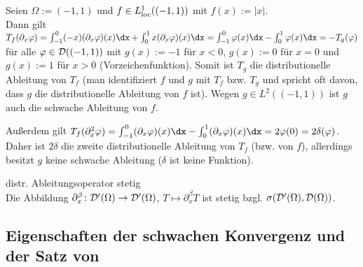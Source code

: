 \begin{Bsp}
    Seien $\Omega := (-1, 1)$ und $f \in L^1_{\text{loc}}((-1, 1))$ mit $f(x) := |x|$.\\
    Dann gilt $T_f(\partial_x \varphi) = \int_{-1}^0 (-x)(\partial_x \varphi)(x) \dx +
    \int_0^1 x (\partial_x \varphi)(x) \dx = \int_{-1}^0 \varphi(x) \dx - \int_0^1 \varphi(x)\dx
    = -T_g(\varphi)$ für alle $\varphi \in \mathcal{D}((-1, 1))$ mit
    $g(x) := -1$ für $x < 0$, $g(x) := 0$ für $x = 0$ und $g(x) := 1$ für $x > 0$
    (Vorzeichenfunktion).
    Somit ist $T_g$ die distributionelle Ableitung von $T_f$
    (man identifiziert $f$ und $g$ mit $T_f$ bzw. $T_g$ und spricht oft davon,
    dass $g$ die distributionelle Ableitung von $f$ ist).
    Wegen $g \in L^2((-1, 1))$ ist $g$ auch die schwache Ableitung von $f$.

    Außerdem gilt
    $T_f(\partial_x^2 \varphi) =
    \int_{-1}^0 (\partial_x \varphi)(x)\dx - \int_0^1 (\partial_x \varphi)(x) \dx =
    2\varphi(0) = 2\delta(\varphi)$.
    Daher ist $2\delta$ die zweite distributionelle Ableitung von $T_f$ (bzw. von $f$),
    allerdings besitzt $g$ keine schwache Ableitung ($\delta$ ist keine Funktion).
\end{Bsp}

\begin{Satz}{distr. Ableitungsoperator stetig}\\
    Die Abbildung $\partial^\beta_x\colon \mathcal{D}'(\Omega) \rightarrow \mathcal{D}'(\Omega)$,
    $T \mapsto \partial^\beta_x T$ ist stetig bzgl. $\sigma(\mathcal{D}'(\Omega), \mathcal{D}(\Omega))$.
\end{Satz}

\pagebreak

\subsection{%
    Eigenschaften der schwachen Konvergenz und der Satz von %
}


